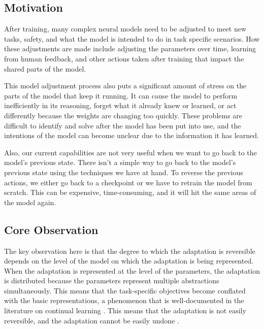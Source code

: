 \documentclass[10pt]{article}
\begin{document}
	\subsection{Motivation} %
	\label{sec:motivation}
	
	After training, many complex neural models need to be adjusted to meet new tasks, safety, and what the model is intended to do in task specific scenarios. How these adjustments are made include adjusting the parameters over time, learning from human feedback, and other actions taken after training that impact the shared parts of the model.

	This model adjustment process also puts a significant amount of stress on the parts of the model that keep it running. It can cause the model to perform inefficiently in its reasoning, forget what it already knew or learned, or act differently because the weights are changing too quickly. These problems are difficult to identify and solve after the model has been put into use, and the intentions of the model can become unclear due to the information it has learned.

	Also, our current capabilities are not very useful when we want to go back to the model’s previous state. There isn’t a simple way to go back to the model’s previous state using the techniques we have at hand. To reverse the previous actions, we either go back to a checkpoint or we have to retrain the model from scratch. This can be expensive, time-consuming, and it will hit the same areas of the model again.
	
	\subsection{Core Observation}
	\label{sec:observation}
	
	The key observation here is that the degree to which the adaptation is reversible depends on the level of the model on which the adaptation is being represented. When the adaptation is represented at the level of the parameters, the adaptation is distributed because the parameters represent multiple abstractions simultaneously. This means that the task-specific objectives become conflated with the basic representations, a phenomenon that is well-documented in the literature on continual learning \cite{kirkpatrick2017ewc,delange2021continual}. This means that the adaptation is not easily reversible, and the adaptation cannot be easily undone \cite{kaushik2021rmn}.
	
\end{document}
